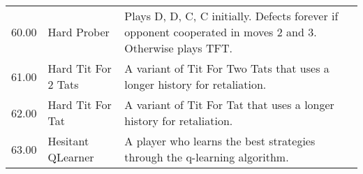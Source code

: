\begin{table}[!hbtp]
\begin{adjustbox}{width=2\textwidth, angle=90}
\begin{tabular}{rll}
	60.00  & Hard Prober                 & Plays D, D, C, C initially. Defects forever if opponent cooperated in moves
	2 and 3. Otherwise plays TFT.                                                                                                                                                                                                                                                                                                                                                                                                                                                                                                                                                                                                                                                                                                                                                                                                                                                                                                            \\
	61.00  & Hard Tit For 2 Tats         & A variant of Tit For Two Tats that uses a longer history for
	retaliation.                                                                                                                                                                                                                                                                                                                                                                                                                                                                                                                                                                                                                                                                                                                                                                                                                                                                                                                                            \\
	62.00  & Hard Tit For Tat            & A variant of Tit For Tat that uses a longer history for retaliation.                                                              \\
	63.00  & Hesitant QLearner           & A player who learns the best strategies through the q-learning algorithm.


\end{tabular}
\end{adjustbox}
\end{table}
